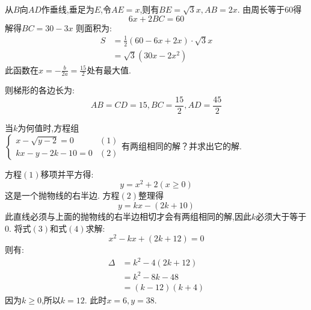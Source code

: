 \begin{questions}
	\begin{solution}
		\begin{center}
		\end{center}

		从$B$向$AD$作垂线,垂足为$E$,令$AE=x$,则有$BE=\sqrt{3}x, AB=2x$.
		由周长等于$60$得
		\begin{equation*}
			6x + 2BC = 60
		\end{equation*}
		解得$BC = 30 - 3x$
		则面积为:
		\begin{align*}
			S & = \frac12(60-6x + 2x)\cdot\sqrt{3}x \\
			  & = \sqrt{3}(30x - 2x^2)
		\end{align*}
		此函数在$x=-\frac{b}{2a} = \frac{15}{2}$处有最大值.

		则梯形的各边长为:
		\begin{equation*}
			AB = CD = 15, BC = \frac{15}{2}, AD = \frac{45}{2}
		\end{equation*}
	\end{solution}

	\question[10] 当$k$为何值时,方程组 \begin{math}
		\left\{
		\begin{array}{lr}
			x - \sqrt{y - 2} = 0 & (1) \\
			kx - y - 2k - 10 = 0 & (2)
		\end{array}
		\right. 有两组相同的解？并求出它的解.
	\end{math}

	\begin{solution}
		方程$(1)$移项并平方得:
		\begin{equation*}
			y=x^2 + 2 (x \geqslant 0) \tag{3}
		\end{equation*}
		这是一个抛物线的右半边.
		方程$(2)$整理得
		\begin{equation*}
			y=kx - (2k + 10) \tag{4}
		\end{equation*}
		此直线必须与上面的抛物线的右半边相切才会有两组相同的解,因此$k$必须大于等于0.
		将式$(3)$和式$(4)$求解:
		\begin{equation*}
			x^2 - kx + (2k + 12) = 0
		\end{equation*}
		则有:
		\begin{align*}
			\Delta & = k^2 - 4(2k + 12) \\
			       & = k^2 - 8k - 48    \\
			       & = (k-12)(k+4)
		\end{align*}
		因为$k\geqslant 0$,所以$k=12$.
		此时$x=6, y=38$.
	\end{solution}


\end{questions}
